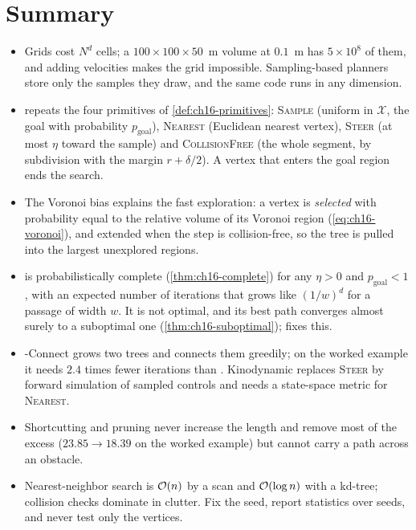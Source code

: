 \section{Summary}
\begin{summary}
\begin{itemize}
  \item Grids cost $N^{d}$ cells; a $100\times100\times50$~m volume at
        $0.1$~m has $5\times10^{8}$ of them, and adding velocities makes the
        grid impossible. Sampling-based planners store only the samples they
        draw, and the same code runs in any dimension.
  \item \rrt repeats the four primitives of \cref{def:ch16-primitives}:
        \textsc{Sample} (uniform in
        $\mathcal{X}$, the goal with probability $p_{\mathrm{goal}}$),
        \textsc{Nearest} (Euclidean nearest vertex), \textsc{Steer} (at most
        $\eta$ toward the sample) and \textsc{CollisionFree} (the whole
        segment, by subdivision with the margin $r+\delta/2$). A vertex that
        enters the goal region ends the search.
  \item The Voronoi bias explains the fast exploration: a vertex is
        \emph{selected} with probability equal to the relative volume of its
        Voronoi region (\cref{eq:ch16-voronoi}), and extended when the step is
        collision-free, so the tree is pulled into the largest unexplored
        regions.
  \item \rrt is probabilistically complete (\cref{thm:ch16-complete}) for any
        $\eta>0$ and $p_{\mathrm{goal}}<1$, with an expected number of
        iterations that grows like $(1/w)^{d}$ for a passage of width $w$.
        It is not optimal, and its best path converges almost surely to a
        suboptimal one (\cref{thm:ch16-suboptimal}); \rrtstar fixes this.
  \item \rrt-Connect grows two trees and connects them greedily; on the
        worked example it needs $2.4$ times fewer iterations than \rrt.
        Kinodynamic \rrt replaces \textsc{Steer} by forward simulation of
        sampled controls and needs a state-space metric for \textsc{Nearest}.
  \item Shortcutting and pruning never increase the length and remove most
        of the excess ($23.85\to18.39$ on the worked example) but cannot
        carry a path across an obstacle.
  \item Nearest-neighbor search is $\mathcal{O}\!\left(n\right)$ by a scan and $\mathcal{O}\!\left(\log n\right)$
        with a kd-tree; collision checks dominate in clutter. Fix the seed,
        report statistics over seeds, and never test only the vertices.
\end{itemize}
\end{summary}

